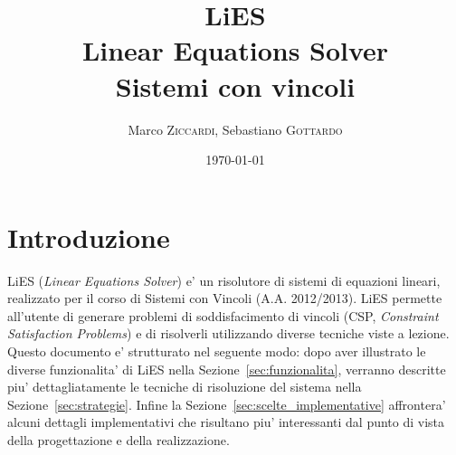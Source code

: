 \documentclass{article}
\title{LiES \\ Linear Equations Solver \\ Sistemi con vincoli} %
\author{Marco \textsc{Ziccardi}, Sebastiano \textsc{Gottardo}} %
\date{\today} %
\begin{document}
\maketitle %




\section{Introduzione}
\label{sec:introduzione}

LiES (\textit{Linear Equations Solver}) e' un risolutore di sistemi di equazioni lineari, realizzato per il corso di Sistemi con Vincoli (A.A. 2012/2013). LiES permette all'utente di generare problemi di soddisfacimento di vincoli (CSP, \textit{Constraint Satisfaction Problems}) e di risolverli utilizzando diverse tecniche viste a lezione.\\

Questo documento e' strutturato nel seguente modo: dopo aver illustrato le diverse funzionalita' di LiES nella Sezione~\ref{sec:funzionalita}, verranno descritte piu' dettagliatamente le tecniche di risoluzione del sistema nella Sezione~\ref{sec:strategie}. Infine la Sezione~\ref{sec:scelte_implementative} affrontera' alcuni dettagli implementativi che risultano piu' interessanti dal punto di vista della progettazione e della realizzazione.

\end{document}
